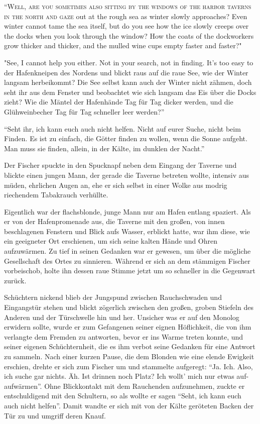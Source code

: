 \lettrine{``W}{ell, are you sometimes also sitting by the windows of the harbor taverns in the north and gaze} out at the rough sea as winter slowly approaches? Even winter cannot tame the sea itself, but do you see how the ice slowly creeps over the docks when you look through the window? How the coats of the dockworkers grow thicker and thicker, and the mulled wine cups empty faster and faster?"

"See, I cannot help you either. Not in your search, not in finding. It's too easy to
der Hafenkneipen des Nordens und blickt raus auf die raue See, wie der Winter langsam herbeikommt? Die See selbst kann auch der Winter nicht zähmen, doch seht ihr aus dem Fenster und beobachtet wie sich langsam das Eis über die Docks zieht? Wie die Mäntel der Hafenhände Tag für Tag dicker werden, und die Glühweinbecher Tag für Tag schneller leer werden?''

``Seht ihr, ich kann euch auch nicht helfen. Nicht auf eurer Suche, nicht beim Finden. Es ist zu einfach, die Götter finden zu wollen, wenn die Sonne aufgeht. Man muss sie finden, allein, in der Kälte, im dunklen der Nacht.''

Der Fischer spuckte in den Spucknapf neben dem Eingang der Taverne und blickte einen jungen Mann, der gerade die Taverne betreten wollte, intensiv aus müden, ehrlichen Augen an, ehe er sich selbst in einer Wolke aus modrig riechendem Tabakrauch verhüllte.

Eigentlich war der flachsblonde, junge Mann nur am Hafen entlang spaziert. Als er von der Hafenpromenade aus, die Taverne mit den großen, von innen beschlagenen Fenstern und Blick aufs Wasser, erblickt hatte, war ihm diese, wie ein geeigneter Ort erschienen, um sich seine kalten Hände und Ohren aufzuwärmen. Zu tief in seinen Gedanken war er gewesen, um über die mögliche Gesellschaft des Ortes zu sinnieren.
Während er sich an dem stämmigen Fischer vorbeischob, holte ihn dessen raue Stimme jetzt um so schneller in die Gegenwart zurück.

Schüchtern nickend blieb der Jungspund zwischen Rauchschwaden und Eingangstür stehen und blickt zögerlich zwischen den großen, groben Stiefeln des Anderen und der Türschwelle hin und her. Unsicher was er auf den Monolog erwidern sollte, wurde er zum Gefangenen seiner eignen Höflichkeit, die von ihm verlangte dem Fremden zu antworten, bevor er ins Warme treten konnte, und seiner eigenen Schüchternheit, die es ihm verbot seine Gedanken für eine Antwort zu sammeln. Nach einer kurzen Pause, die dem Blonden wie eine elende Ewigkeit erschien, drehte er sich zum Fischer um und stammelte aufgeregt: ``Ja. Ich. Also, ich suche gar nichts. Äh. Ist drinnen noch Platz? Ich wollt' mich nur etwas auf-aufwärmen''. Ohne Blickkontakt mit dem Rauchenden aufzunehmen, zuckte er entschuldigend mit den Schultern, so als wollte er sagen ``Seht, ich kann euch auch nicht helfen''. Damit wandte er sich mit von der Kälte geröteten Backen der Tür zu und umgriff deren Knauf.

